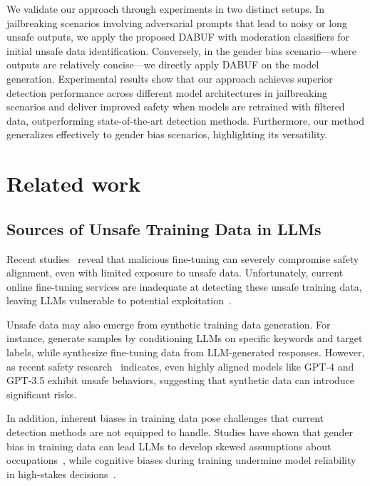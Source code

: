 \documentclass[11pt]{article}
\begin{document}
We validate our approach through experiments in two distinct setups. In jailbreaking scenarios involving adversarial prompts that lead to noisy or long unsafe outputs, we apply the proposed DABUF with moderation classifiers for initial unsafe data identification. Conversely, in the gender bias scenario—where outputs are relatively concise—we directly apply DABUF on the model generation. Experimental results show that our approach achieves superior detection performance across different model architectures in jailbreaking scenarios and deliver improved safety when models are retrained with filtered data, outperforming state-of-the-art detection methods. Furthermore, our method generalizes effectively to gender bias scenarios, highlighting its versatility.

\section{Related work}

\subsection{Sources of Unsafe Training Data in LLMs} 

Recent studies~\citep{yi-etal-2024-vulnerability, qi2023finetuningalignedlanguagemodels} reveal that malicious fine-tuning can severely compromise safety alignment, even with limited exposure to unsafe data. Unfortunately, current online fine-tuning services are inadequate at detecting these unsafe training data, leaving LLMs vulnerable to potential exploitation~\citep{qi2023finetuningalignedlanguagemodels}. 

Unsafe data may also emerge from synthetic training data generation. For instance, \citet{wang-etal-2022-promda} generate samples by conditioning LLMs on specific keywords and target labels, while \citet{wang-etal-2023-self-instruct} synthesize fine-tuning data from LLM-generated responses. However, as recent safety research~\citep{wang2024decodingtrustcomprehensiveassessmenttrustworthiness} indicates, even highly aligned models like GPT-4 and GPT-3.5 exhibit unsafe behaviors, suggesting that synthetic data can introduce significant risks.

In addition, inherent biases in training data pose challenges that current detection methods are not equipped to handle. Studies have shown that gender bias in training data can lead LLMs to develop skewed assumptions about occupations~\citep{Kotek_2023}, while cognitive biases during training undermine model reliability in high-stakes decisions~\citep{itzhak2024instructedbiasinstructiontunedlanguage, echterhoff-etal-2024-cognitive}.
\end{document}
